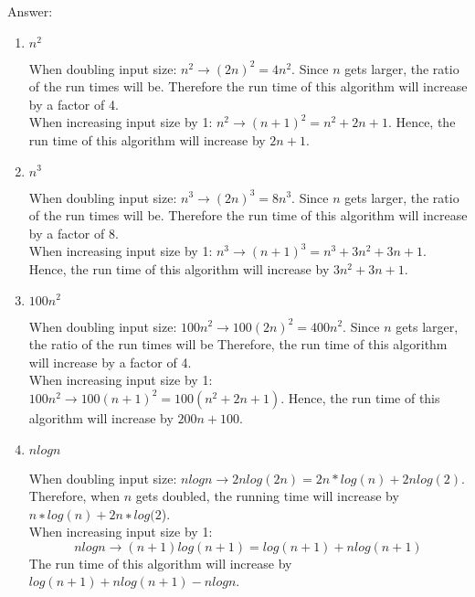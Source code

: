 \documentclass{cpsc413Solutions}
\begin{document}


\begin{problemlist}
\begin{problem}
\begin{answer}
Answer:
\newline
\begin{enumerate}
\item $n^2$ 

When doubling input size: $n^2 \xrightarrow{} (2n)^2 = 4n^2$. 
Since $n$ gets larger, the ratio of the run times will be. Therefore the run time of this algorithm will increase by a factor of 4.\\

When increasing input size by 1: $n^2 \xrightarrow{} (n+1)^2 = n^2 + 2n + 1$.
Hence, the run time of this algorithm will increase by $2n+1$. 

\item $n^3$

When doubling input size: $n^3 \xrightarrow{} (2n)^3 = 8n^3$. 
Since $n$ gets larger, the ratio of the run times will be. Therefore the run time of this algorithm will increase by a factor of 8. \\

When increasing input size by 1: $n^3 \xrightarrow{} (n+1)^3 = n^3 + 3n^2 +3n + 1$. Hence, the run time of this algorithm will increase by $3n^2 +3n + 1$. 

\item $100n^2$

When doubling input size: $100n^2 \xrightarrow{} 100(2n)^2 = 400n^2$. 
Since $n$ gets larger, the ratio of the run times will be Therefore, the run time of this algorithm will increase by a factor of 4.\\

When increasing input size by 1: $100n^2 \xrightarrow{} 100(n+1)^2 = 100(n^2 + 2n + 1)$. Hence, the run time of this algorithm will increase by $200n+100$.

\item $nlogn$

When doubling input size: $nlogn \xrightarrow{} 2n log(2n) = 2n*log(n) +2nlog(2)$. 
Therefore, when $n$ gets doubled, the running time will increase by $n ∗ log(n) + 2n ∗ log(2$).\\

When increasing input size by 1: $$nlogn \xrightarrow{} (n+1)log(n+1) = log(n+1) + nlog(n+1)$$
The run time of this algorithm will increase by $log(n+1)+ nlog(n+1) -nlogn$. 


\end{enumerate}
\end{answer}
\end{problem}
\end{problemlist}
\end{document}
